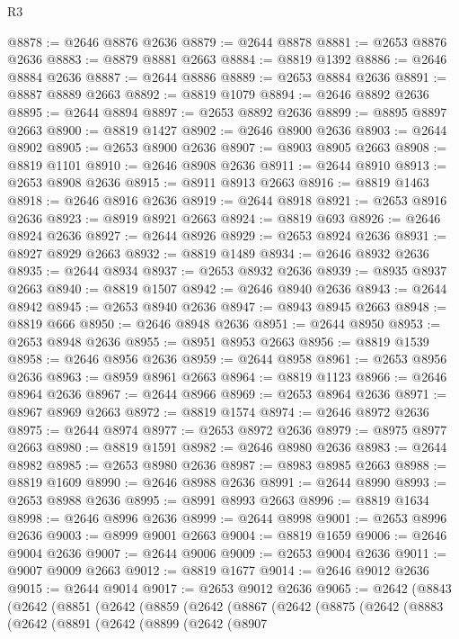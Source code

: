 \begin{lexlean}{R3}
\begin{coremodule}
@8878 := @2646 @8876 @2636
@8879 := @2644 @8878
@8881 := @2653 @8876 @2636
@8883 := @8879 @8881 @2663
@8884 := @8819 @1392
@8886 := @2646 @8884 @2636
@8887 := @2644 @8886
@8889 := @2653 @8884 @2636
@8891 := @8887 @8889 @2663
@8892 := @8819 @1079
@8894 := @2646 @8892 @2636
@8895 := @2644 @8894
@8897 := @2653 @8892 @2636
@8899 := @8895 @8897 @2663
@8900 := @8819 @1427
@8902 := @2646 @8900 @2636
@8903 := @2644 @8902
@8905 := @2653 @8900 @2636
@8907 := @8903 @8905 @2663
@8908 := @8819 @1101
@8910 := @2646 @8908 @2636
@8911 := @2644 @8910
@8913 := @2653 @8908 @2636
@8915 := @8911 @8913 @2663
@8916 := @8819 @1463
@8918 := @2646 @8916 @2636
@8919 := @2644 @8918
@8921 := @2653 @8916 @2636
@8923 := @8919 @8921 @2663
@8924 := @8819 @693
@8926 := @2646 @8924 @2636
@8927 := @2644 @8926
@8929 := @2653 @8924 @2636
@8931 := @8927 @8929 @2663
@8932 := @8819 @1489
@8934 := @2646 @8932 @2636
@8935 := @2644 @8934
@8937 := @2653 @8932 @2636
@8939 := @8935 @8937 @2663
@8940 := @8819 @1507
@8942 := @2646 @8940 @2636
@8943 := @2644 @8942
@8945 := @2653 @8940 @2636
@8947 := @8943 @8945 @2663
@8948 := @8819 @666
@8950 := @2646 @8948 @2636
@8951 := @2644 @8950
@8953 := @2653 @8948 @2636
@8955 := @8951 @8953 @2663
@8956 := @8819 @1539
@8958 := @2646 @8956 @2636
@8959 := @2644 @8958
@8961 := @2653 @8956 @2636
@8963 := @8959 @8961 @2663
@8964 := @8819 @1123
@8966 := @2646 @8964 @2636
@8967 := @2644 @8966
@8969 := @2653 @8964 @2636
@8971 := @8967 @8969 @2663
@8972 := @8819 @1574
@8974 := @2646 @8972 @2636
@8975 := @2644 @8974
@8977 := @2653 @8972 @2636
@8979 := @8975 @8977 @2663
@8980 := @8819 @1591
@8982 := @2646 @8980 @2636
@8983 := @2644 @8982
@8985 := @2653 @8980 @2636
@8987 := @8983 @8985 @2663
@8988 := @8819 @1609
@8990 := @2646 @8988 @2636
@8991 := @2644 @8990
@8993 := @2653 @8988 @2636
@8995 := @8991 @8993 @2663
@8996 := @8819 @1634
@8998 := @2646 @8996 @2636
@8999 := @2644 @8998
@9001 := @2653 @8996 @2636
@9003 := @8999 @9001 @2663
@9004 := @8819 @1659
@9006 := @2646 @9004 @2636
@9007 := @2644 @9006
@9009 := @2653 @9004 @2636
@9011 := @9007 @9009 @2663
@9012 := @8819 @1677
@9014 := @2646 @9012 @2636
@9015 := @2644 @9014
@9017 := @2653 @9012 @2636
@9065 := @2642
    (@8843
      (@2642
        (@8851
          (@2642
            (@8859
              (@2642
                (@8867
                  (@2642
                    (@8875
                      (@2642
                        (@8883
                          (@2642
                            (@8891
                              (@2642
                                (@8899
                                  (@2642
                                    (@8907

\end{coremodule}
\end{lexlean}
